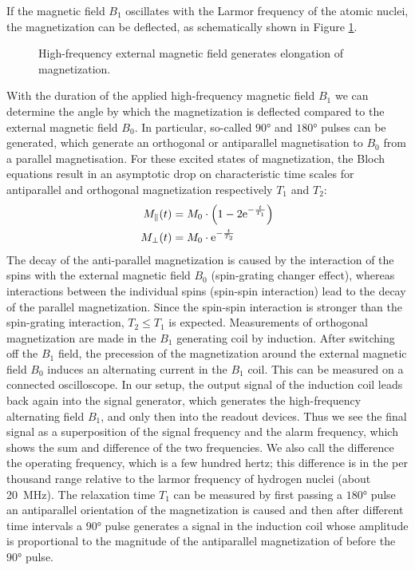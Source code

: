 If the magnetic field $B_1$ oscillates with the Larmor frequency of the atomic nuclei, the magnetization can be deflected, as schematically shown in Figure \ref{fig:magnet}.
\begin{figure}[ht]
\centering

\label{fig:magnet}
\caption{High-frequency external magnetic field generates elongation of magnetization.}
\end{figure}
With the duration of the applied high-frequency magnetic field $B_1$ we can determine the angle by which the magnetization is deflected compared to the external magnetic field $B_0$.
In particular, so-called $\ang{90}$ and $\ang{180}$ pulses can be generated, which generate an orthogonal or antiparallel magnetisation to $B_0$ from a parallel magnetisation.
For these excited states of magnetization, the Bloch equations result in an asymptotic drop on characteristic time scales for antiparallel and orthogonal magnetization respectively $T_1$ and $T_2$:
\begin{align}
M_\parallel(t)&=M_0\cdot\left(1-2\mathrm{e}^{-\frac{t}{T_1}}\right)\\
M_\bot(t)&=M_0\cdot\mathrm{e}^{-\frac{t}{T_2}}
\end{align}
The decay of the anti-parallel magnetization is caused by the interaction of the spins with the external magnetic field $B_0$ (spin-grating changer effect), whereas interactions between the individual spins (spin-spin interaction) lead to the decay of the parallel magnetization.
Since the spin-spin interaction is stronger than the spin-grating interaction, $T_2\leq T_1$ is expected.
Measurements of orthogonal magnetization are made in the $B_1$ generating coil by induction.
After switching off the $B_1$ field, the precession of the magnetization around the external magnetic field $B_0$ induces an alternating current in the $B_1$ coil.
This can be measured on a connected oscilloscope.
In our setup, the output signal of the induction coil leads back again into the signal generator, which generates the high-frequency alternating field $B_1$, and only then into the readout devices.
Thus we see the final signal as a superposition of the signal frequency and the alarm frequency, which shows the sum and difference of the two frequencies.
We also call the difference the operating frequency, which is a few hundred hertz; this difference is in the per thousand range relative to the larmor frequency of hydrogen nuclei (about \SI{20}{\mega\hertz}).
The relaxation time $T_1$ can be measured by first passing a $\ang{180}$ pulse
an antiparallel orientation of the magnetization is caused and then after different time intervals a $\ang{90}$ pulse generates a signal in the induction coil whose amplitude is proportional to the magnitude of the antiparallel magnetization of before the $\ang{90}$ pulse.
